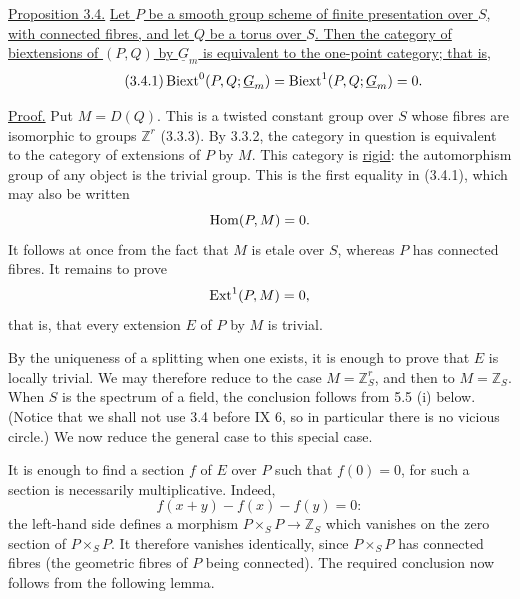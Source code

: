 
\medskip
\noindent\underline{Proposition 3.4.}  \underline{Let $P$ be a smooth
group scheme of finite presentation over $S$, with connected fibres,
and let $Q$ be a torus over $S$.  Then the category of biextensions
of $(P,Q)$ by $\underline G_m$ is equivalent to the one-point
category; that is,}
\begin{equation}\tag{3.4.1}
 \Biext^0(P,Q;\underline G_m)=
 \Biext^1(P,Q;\underline G_m)=0.
\end{equation}

\noindent\underline{Proof.}  Put $M=D(Q)$.  This is a twisted
constant group over $S$ whose fibres are isomorphic to groups
$\mathbb Z^r$ (3.3.3).  By 3.3.2, the category in question is
equivalent to the category of extensions of $P$ by $M$.  This
category is \underline{rigid}: the automorphism group of any object
is the trivial group.  This is the first equality in (3.4.1), which
may also be written
\[
 \operatorname{Hom}(P,M)=0.
\]
It follows at once from the fact that $M$ is etale over $S$, whereas
$P$ has connected fibres.  It remains to prove
\[
 \operatorname{Ext}^1(P,M)=0,
\]
that is, that every extension $E$ of $P$ by $M$ is trivial.

By the uniqueness of a splitting when one exists, it is enough to
prove that $E$ is locally trivial.  We may therefore reduce to the
case $M=\mathbb Z_S^r$, and then to $M=\mathbb Z_S$.  When $S$ is the
spectrum of a field, the conclusion follows from 5.5 (i) below.
(Notice that we shall not use 3.4 before IX 6, so in particular there
is no vicious circle.)  We now reduce the general case to this
special case.

It is enough to find a section $f$ of $E$ over $P$ such that
$f(0)=0$, for such a section is necessarily multiplicative.  Indeed,
\[
 f(x+y)-f(x)-f(y)=0:
\]
the left-hand side defines a morphism
$P\times_S P\longrightarrow\mathbb Z_S$ which vanishes on the zero
section of $P\times_S P$.  It therefore vanishes identically, since
$P\times_S P$ has connected fibres (the geometric fibres of $P$
being connected).  The required conclusion now follows from the
following lemma.

